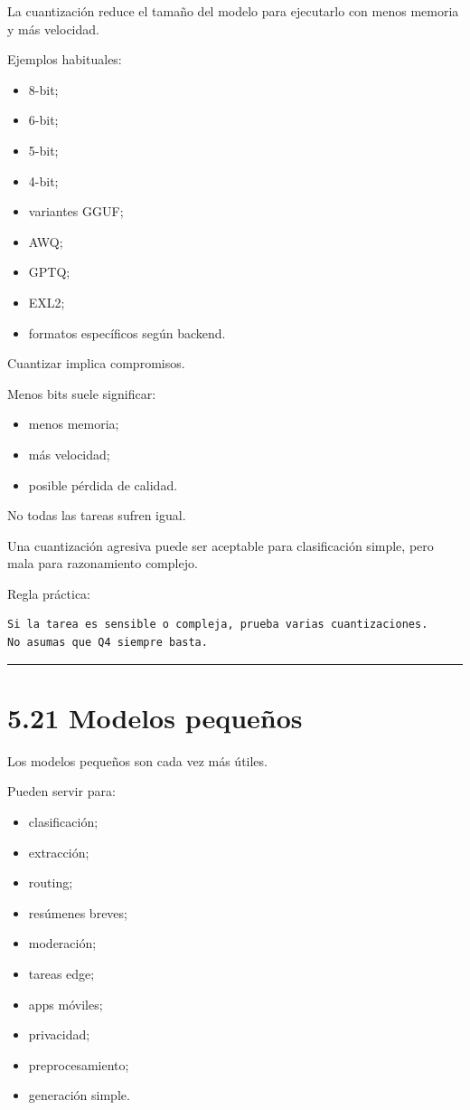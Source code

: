 La cuantización reduce el tamaño del modelo para ejecutarlo con menos
memoria y más velocidad.

Ejemplos habituales:

\begin{itemize}
\tightlist
\item
  8-bit;
\item
  6-bit;
\item
  5-bit;
\item
  4-bit;
\item
  variantes GGUF;
\item
  AWQ;
\item
  GPTQ;
\item
  EXL2;
\item
  formatos específicos según backend.
\end{itemize}

Cuantizar implica compromisos.

Menos bits suele significar:

\begin{itemize}
\tightlist
\item
  menos memoria;
\item
  más velocidad;
\item
  posible pérdida de calidad.
\end{itemize}

No todas las tareas sufren igual.

Una cuantización agresiva puede ser aceptable para clasificación simple,
pero mala para razonamiento complejo.

Regla práctica:

\begin{lstlisting}
Si la tarea es sensible o compleja, prueba varias cuantizaciones.
No asumas que Q4 siempre basta.
\end{lstlisting}

\begin{center}\rule{0.5\linewidth}{0.5pt}\end{center}

\section{5.21 Modelos pequeños}\label{modelos-pequeuxf1os}

Los modelos pequeños son cada vez más útiles.

Pueden servir para:

\begin{itemize}
\tightlist
\item
  clasificación;
\item
  extracción;
\item
  routing;
\item
  resúmenes breves;
\item
  moderación;
\item
  tareas edge;
\item
  apps móviles;
\item
  privacidad;
\item
  preprocesamiento;
\item
  generación simple.
\end{itemize}

